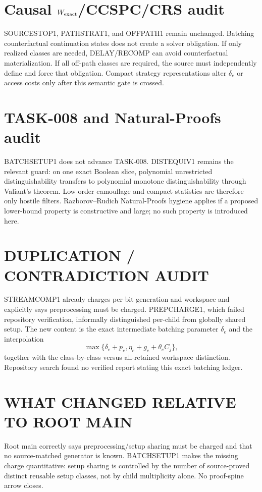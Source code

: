 \documentclass[11pt]{article}
\begin{document}
\section*{Causal $W_{\rm exact}$/CCSPC/CRS audit}
SOURCESTOP1, PATHSTRAT1, and OFFPATH1 remain unchanged. Batching counterfactual continuation states does not create a solver obligation. If only realized classes are needed, DELAY/RECOMP can avoid counterfactual materialization. If all off-path classes are required, the source must independently define and force that obligation. Compact strategy representations alter $\delta_e$ or access costs only after this semantic gate is crossed.

\section*{TASK-008 and Natural-Proofs audit}
BATCHSETUP1 does not advance TASK-008. DISTEQUIV1 remains the relevant guard: on one exact Boolean slice, polynomial unrestricted distinguishability transfers to polynomial monotone distinguishability through Valiant's theorem. Low-order camouflage and compact statistics are therefore only hostile filters. Razborov--Rudich Natural-Proofs hygiene applies if a proposed lower-bound property is constructive and large; no such property is introduced here.

\section*{DUPLICATION / CONTRADICTION AUDIT}
STREAMCOMP1 already charges per-bit generation and workspace and explicitly says preprocessing must be charged. PREPCHARGE1, which failed repository verification, informally distinguished per-child from globally shared setup. The new content is the exact intermediate batching parameter $\delta_e$ and the interpolation
\[
\max\{\delta_e+p_e,\eta_e+g_e+\theta_e C_j\},
\]
together with the class-by-class versus all-retained workspace distinction. Repository search found no verified report stating this exact batching ledger.

\section*{WHAT CHANGED RELATIVE TO ROOT MAIN}
Root main correctly says preprocessing/setup sharing must be charged and that no source-matched generator is known. BATCHSETUP1 makes the missing charge quantitative: setup sharing is controlled by the number of source-proved distinct reusable setup classes, not by child multiplicity alone. No proof-spine arrow closes.
\end{document}
